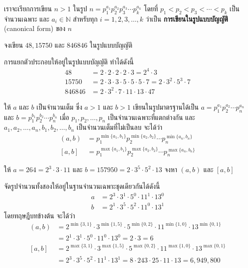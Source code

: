 \begin{agreementbox}
	เราจะเรียกการเขียน $n > 1$ ในรูป $n = p_1^{a_1} p_2^{a_2} p_3^{a_3} \cdots p_k^{a_k}$ โดยที่ $p_1 < p_2 < p_3 < \cdots < p_k$ เป็นจำนวนเฉพาะ และ $a_i \in \mathbb{N}$ สำหรับทุก $i = 1, 2, 3, \ldots, k$ ว่าเป็น \textbf{การเขียนในรูปแบบบัญญัติ} (canonical form) ของ $n$
\end{agreementbox}

\begin{examplebox}
	จงเขียน $48, 15750$ และ $846846$ ในรูปแบบบัญญัติ 
\end{examplebox}
	\solution การแยกตัวประกอบให้อยู่ในรูปแบบบัญญัติ ทำได้ดังนี้
\begin{align*}
	48 &= 2 \cdot 2 \cdot 2 \cdot 2 \cdot 3 = 2^4 \cdot 3 \\
	15750 &= 2 \cdot 3 \cdot 3 \cdot 5 \cdot 5 \cdot 5 \cdot 7 = 2 \cdot 3^2 \cdot 5^3 \cdot 7 \\
	846846 &= 2 \cdot 3^2 \cdot 7 \cdot 11 \cdot 13 \cdot 47
\end{align*}

\newpage
\begin{theorembox}
	ให้ $a$ และ $b$ เป็นจำนวนเต็ม ซึ่ง $a > 1$ และ $b > 1$ เขียนในรูปมาตรฐานได้เป็น $a = p_1^{a_1} p_2^{a_2} \cdots p_n^{a_n}$ และ $b = p_1^{b_1} p_2^{b_2} \cdots p_n^{b_n}$ เมื่อ $p_1, p_2, \ldots, p_n$ เป็นจำนวนเฉพาะที่แตกต่างกัน และ $a_1, a_2, \ldots, a_n, b_1, b_2, \ldots, b_n$ เป็นจำนวนเต็มที่ไม่เป็นลบ จะได้ว่า
	\begin{align*}
		(a, b) &= p_1^{\min\{a_1, b_1\}} p_2^{\min\{a_2, b_2\}} \cdots p_n^{\min\{a_n, b_n\}} \\
		[a, b] &= p_1^{\max\{a_1, b_1\}} p_2^{\max\{a_2, b_2\}} \cdots p_n^{\max\{a_n, b_n\}}
	\end{align*}
\end{theorembox}

\begin{examplebox}
	ให้ $a = 264 = 2^3 \cdot 3 \cdot 11$ และ $b = 157950 = 2 \cdot 3^5 \cdot 5^2 \cdot 13$ จงหา $(a, b)$ และ $[a, b]$ 
\end{examplebox}
	\solution จัดรูปจำนวนทั้งสองให้อยู่ในฐานจำนวนเฉพาะชุดเดียวกันได้ดังนี้
\begin{align*}
	a &= 2^3 \cdot 3^1 \cdot 5^0 \cdot 11^1 \cdot 13^0 \\
	b &= 2^1 \cdot 3^5 \cdot 5^2 \cdot 11^0 \cdot 13^1 
\end{align*}
โดยทฤษฎีบทข้างต้น จะได้ว่า
\begin{align*}
	(a, b) &= 2^{\min\{3,1\}} \cdot 3^{\min\{1,5\}} \cdot 5^{\min\{0,2\}} \cdot 11^{\min\{1,0\}} \cdot 13^{\min\{0,1\}} \\
	&= 2^1 \cdot 3^1 \cdot 5^0 \cdot 11^0 \cdot 13^0 = 2 \cdot 3 = 6 \\[0.5em]
	[a, b] &= 2^{\max\{3,1\}} \cdot 3^{\max\{1,5\}} \cdot 5^{\max\{0,2\}} \cdot 11^{\max\{1,0\}} \cdot 13^{\max\{0,1\}} \\
	&= 2^3 \cdot 3^5 \cdot 5^2 \cdot 11^1 \cdot 13^1 = 8 \cdot 243 \cdot 25 \cdot 11 \cdot 13 = 6,949,800
\end{align*}

